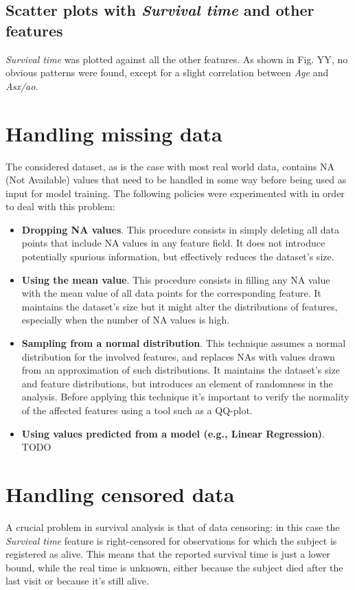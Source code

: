 \documentclass[12pt]{report}
\begin{document}
\subsection*{Scatter plots with \textit{Survival time} and other features}
\textit{Survival time} was plotted against all the other features. As shown in Fig. YY, no obvious patterns were found, except for a slight correlation between \textit{Age} and \textit{Asx/ao}.

\section{Handling missing data}
The considered dataset, as is the case with most real world data, contains NA (Not Available) values that need to be handled in some way before being used as input for model training. The following policies were experimented with in order to deal with this problem:
\begin{itemize}
\item \textbf{Dropping NA values}. This procedure consists in simply deleting all data points that include NA values in any feature field. It does not introduce potentially spurious information, but effectively reduces the dataset's size.
\item \textbf{Using the mean value}. This procedure consists in filling any NA value with the mean value of all data points for the corresponding feature. It maintains the dataset's size but it might alter the distributions of features, especially when the number of NA values is high.
\item \textbf{Sampling from a normal distribution}. This technique assumes a normal distribution for the involved features, and replaces NAs with values drawn from an approximation of such distributions. It maintains the dataset's size and feature distributions, but introduces an element of randomness in the analysis. Before applying this technique it's important to verify the normality of the affected features using a tool such as a QQ-plot.
\item \textbf{Using values predicted from a model (e.g., Linear Regression)}. TODO
\end{itemize}

\section{Handling censored data}
A crucial problem in survival analysis is that of data censoring: in this case the \textit{Survival time} feature is right-censored for observations for which the subject is registered as alive. This means that the reported survival time is just a lower bound, while the real time is unknown, either because the subject died after the last visit or because it's still alive.
\end{document}
